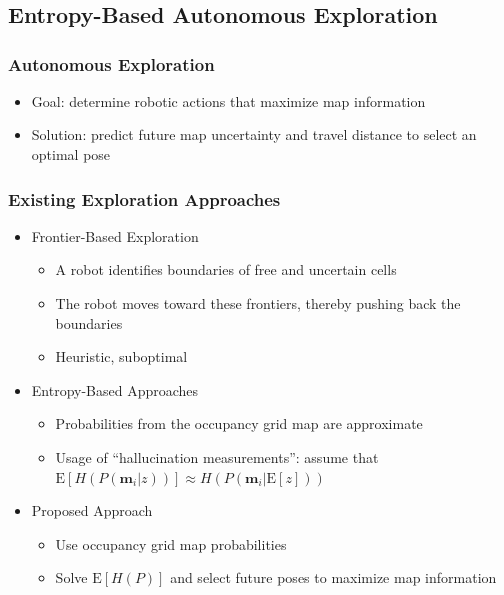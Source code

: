 \documentclass[11pt,professionalfonts,hyperref={pdftex,pdfpagemode=none,pdfstartview=FitH}]{beamer}
\begin{document}
\section*{}
\subsection*{Entropy-Based Autonomous Exploration}

\begin{frame}
\frametitle{Autonomous Exploration}

\begin{itemize}
	\item Goal: determine robotic actions that maximize map information
	\item Solution: predict future map uncertainty and travel distance to select an optimal pose
\end{itemize}

\end{frame}




\begin{frame}
\frametitle{Existing Exploration Approaches}

\begin{itemize}
	\item Frontier-Based Exploration
	\begin{itemize}
		\item A robot identifies boundaries of free and uncertain cells
		\item The robot moves toward these frontiers, thereby pushing back the boundaries
		\item Heuristic, suboptimal
	\end{itemize}
	\vspace*{0.0cm}\pause
	\item Entropy-Based Approaches
	\begin{itemize}
		\item Probabilities from the occupancy grid map are approximate
		\item Usage of ``hallucination measurements'': assume that $\text{E}[H(P(\mathbf{m}_i|z))]\approx H(P(\mathbf{m}_i|\text{E}[z]))$
	\end{itemize}
	\vspace*{0.0cm}\pause
	\item Proposed Approach
	\begin{itemize}
		\item Use occupancy grid map probabilities
		\item Solve $\text{E}[H(P)]$ and select future poses to maximize map information
	\end{itemize}
\end{itemize}
\end{frame}
\end{document}
